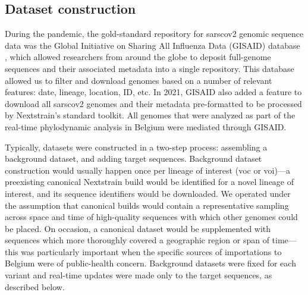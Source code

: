 \subsection{Dataset construction}
During the pandemic, the gold-standard repository for \gls{sarscov2} genomic sequence data was the Global Initiative on Sharing All Influenza Data (GISAID) database \citep{shu2017gisaid}, which allowed researchers from around the globe to deposit full-genome sequences and their associated metadata into a single repository.
This database allowed us to filter and download genomes based on a number of relevant features: date, lineage, location, ID, etc.
In 2021, GISAID also added a feature to download all \gls{sarscov2} genomes and their metadata pre-formatted to be processed by Nextstrain's standard toolkit.
All genomes that were analyzed as part of the real-time phylodynamic analysis in Belgium were mediated through GISAID.

Typically, datasets were constructed in a two-step process: assembling a background dataset, and adding target sequences.
Background dataset construction would usually happen once per lineage of interest (\gls{voc} or \gls{voi})---a preexisting canonical Nextstrain build would be identified for a novel lineage of interest, and its sequence identifiers would be downloaded.
We operated under the assumption that canonical builds would contain a representative sampling across space and time of high-quality sequences with which other genomes could be placed.
On occasion, a canonical dataset would be supplemented with sequences which more thoroughly covered a geographic region or span of time---this was particularly important when the specific sources of importations to Belgium were of public-health concern.
Background datasets were fixed for each variant and real-time updates were made only to the target sequences, as described below.

